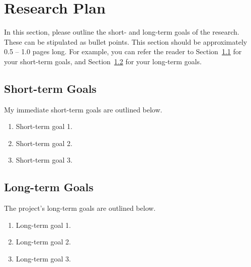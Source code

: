\documentclass[10pt]{article}
\begin{document}
\section{Research Plan}
In this section, please outline the short- and long-term goals of the research. These can be stipulated as bullet points. This section should be approximately 0.5 -- 1.0 pages long. For example, you can refer the reader to Section~{\ref{sec:shorttermgoals}} for your short-term goals, and Section~{\ref{sec:longtermgoals}} for your long-term goals.

\subsection{Short-term Goals}
\label{sec:shorttermgoals}
My immediate short-term goals are outlined below.
\begin{enumerate}
    \item Short-term goal 1.
    \item Short-term goal 2.
    \item Short-term goal 3.
\end{enumerate}

\subsection{Long-term Goals}
\label{sec:longtermgoals}
The project's long-term goals are outlined below.
\begin{enumerate}
    \item Long-term goal 1.
    \item Long-term goal 2.
    \item Long-term goal 3.
\end{enumerate}


\newpage

{}
\end{document}
